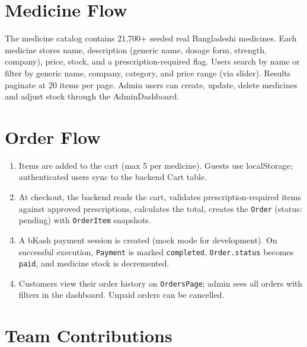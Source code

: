\documentclass[12pt,a4paper]{article}
\begin{document}
\section{Medicine Flow}
The medicine catalog contains 21,700+ seeded real Bangladeshi medicines. Each medicine stores name, description (generic name, dosage form, strength, company), price, stock, and a prescription-required flag. Users search by name or filter by generic name, company, category, and price range (via slider). Results paginate at 20 items per page. Admin users can create, update, delete medicines and adjust stock through the AdminDashboard.

\section{Order Flow}
\begin{enumerate}
    \item Items are added to the cart (max 5 per medicine). Guests use localStorage; authenticated users sync to the backend Cart table.
    \item At checkout, the backend reads the cart, validates prescription-required items against approved prescriptions, calculates the total, creates the \texttt{Order} (status: pending) with \texttt{OrderItem} snapshots.
    \item A bKash payment session is created (mock mode for development). On successful execution, \texttt{Payment} is marked \texttt{completed}, \texttt{Order.status} becomes \texttt{paid}, and medicine stock is decremented.
    \item Customers view their order history on \texttt{OrdersPage}; admin sees all orders with filters in the dashboard. Unpaid orders can be cancelled.
\end{enumerate}

\section{Team Contributions}
\end{document}
